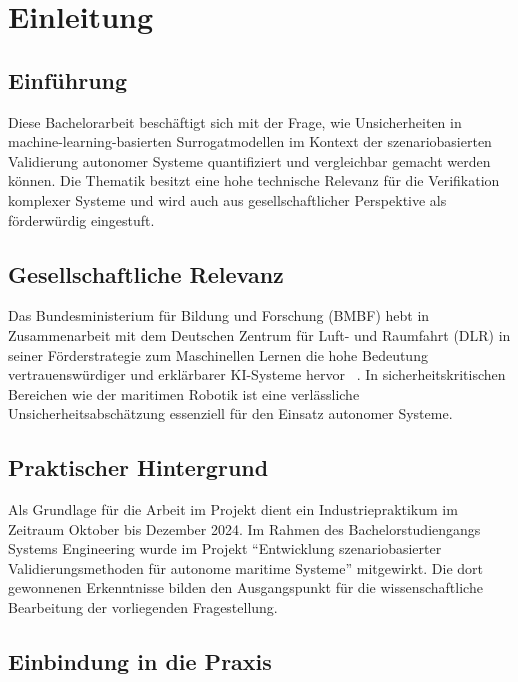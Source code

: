 
\chapter{Einleitung}
\label{chapter:introduction}

\section{Einführung}

Diese Bachelorarbeit beschäftigt sich mit der Frage, wie Unsicherheiten in machine-learning-basierten Surrogatmodellen im Kontext der szenariobasierten Validierung autonomer Systeme quantifiziert und vergleichbar gemacht werden können. Die Thematik besitzt eine hohe technische Relevanz für die Verifikation komplexer Systeme und wird auch aus gesellschaftlicher Perspektive als förderwürdig eingestuft.

\section{Gesellschaftliche Relevanz}

Das Bundesministerium für Bildung und Forschung (BMBF) hebt in Zusammenarbeit mit dem Deutschen Zentrum für Luft- und Raumfahrt (DLR) in seiner Förderstrategie zum Maschinellen Lernen die hohe Bedeutung vertrauenswürdiger und erklärbarer KI-Systeme hervor ~\parencite{bmbf2025}. In sicherheitskritischen Bereichen wie der maritimen Robotik ist eine verlässliche Unsicherheitsabschätzung essenziell für den Einsatz autonomer Systeme.

\section{Praktischer Hintergrund}

Als Grundlage für die Arbeit im Projekt dient ein Industriepraktikum im Zeitraum Oktober bis Dezember 2024. Im Rahmen des Bachelorstudiengangs Systems Engineering wurde im Projekt \enquote{Entwicklung szenariobasierter Validierungsmethoden für autonome maritime Systeme} mitgewirkt. Die dort gewonnenen Erkenntnisse bilden den Ausgangspunkt für die wissenschaftliche Bearbeitung der vorliegenden Fragestellung.

\section{Einbindung in die Praxis}

